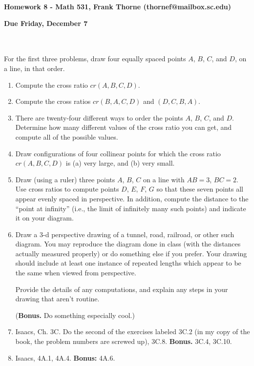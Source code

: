 \documentclass[12pt]{article}
\begin{document}
\setlength{\topmargin}{-2mm}





\begin{center}{\bf Homework 8 - Math 531, Frank Thorne (thornef@mailbox.sc.edu)}
\end{center}
\begin{center}
{\bf Due Friday, December 7}
\end{center}
\\
\\
For the first three problems, draw four equally spaced points $A$, $B$, $C$, and $D$, on a line, in that order.
\begin{enumerate}[(1)]
\item
Compute the cross ratio $cr(A, B, C, D)$.
\item
Compute the cross ratios $cr(B, A, C, D)$ and $(D, C, B, A)$.
\item
There are twenty-four different ways to order the points $A$, $B$, $C$, and $D$. Determine how many different values of the cross ratio you can get, and compute all of the possible values.
\item
Draw configurations of four collinear points for which the cross ratio $cr(A, B, C, D)$ is (a) very large, and (b) very small. 
\item
Draw (using a ruler) three points $A$, $B$, $C$ on a line with $AB = 3$, $BC = 2$. Use cross ratios to compute points
$D$, $E$, $F$, $G$ so that these seven points all appear evenly spaced in perspective. In addition, compute the distance to
the ``point at infinity'' (i.e., the limit of infinitely many such points) and indicate it on your diagram.
\item
Draw a 3-d perspective drawing of a tunnel, road, railroad, or other such diagram. You may reproduce the diagram done in class
(with the distances actually measured properly) or do something else if you prefer. Your drawing should include at least one
instance of repeated lengths which appear to be the same when viewed from perspective.

Provide the details of any computations, and explain any steps in your drawing that aren't routine.

({\bf Bonus.} Do something especially cool.)
\item
Isaacs, Ch. 3C. Do the second of the exercises labeled 3C.2 (in my copy of the book, the problem numbers are screwed up), 3C.8.
{\bf Bonus.} 3C.4, 3C.10.
\item
Isaacs, 4A.1, 4A.4. {\bf Bonus:} 4A.6.


\end{enumerate}
\end{document}
